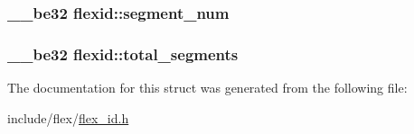 \subsubsection[{\texorpdfstring{segment\+\_\+num}{segment_num}}]{\setlength{\rightskip}{0pt plus 5cm}\+\_\+\+\_\+be32 flexid\+::segment\+\_\+num}\hypertarget{structflexid_ae502fa12b4cd189628452ca8c6fd0dc0}{}\label{structflexid_ae502fa12b4cd189628452ca8c6fd0dc0}
\subsubsection[{\texorpdfstring{total\+\_\+segments}{total_segments}}]{\setlength{\rightskip}{0pt plus 5cm}\+\_\+\+\_\+be32 flexid\+::total\+\_\+segments}\hypertarget{structflexid_a06122ad6fde6feb1e4edba60f476640e}{}\label{structflexid_a06122ad6fde6feb1e4edba60f476640e}


The documentation for this struct was generated from the following file\+:\begin{DoxyCompactItemize}
\item 
include/flex/\hyperlink{include_2flex_2flex__id_8h}{flex\+\_\+id.\+h}\end{DoxyCompactItemize}
